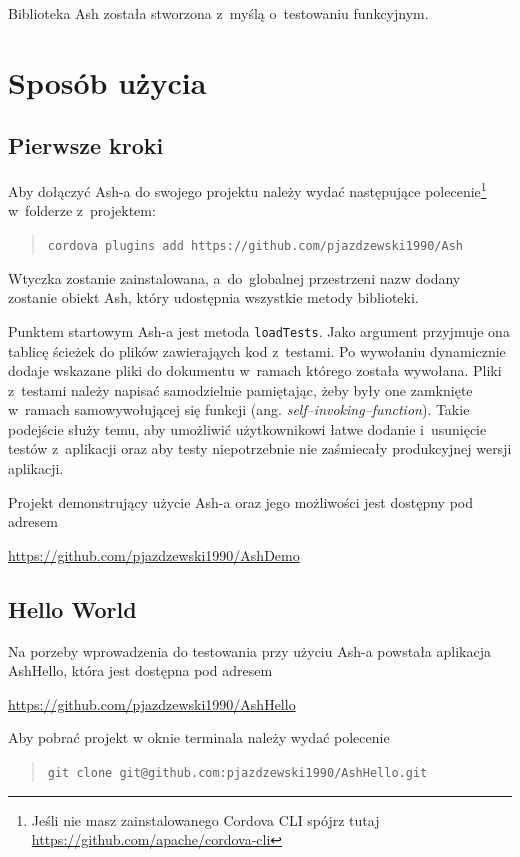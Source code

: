 \documentclass[brudnopis]{xmgr}
\begin{document}
Biblioteka Ash została stworzona z~myślą o~testowaniu funkcyjnym.

\chapter{Sposób użycia}
\section{Pierwsze kroki}

Aby dołączyć Ash-a do swojego projektu należy wydać następujące polecenie\footnote{Jeśli nie masz zainstalowanego Cordova CLI spójrz tutaj \url{https://github.com/apache/cordova-cli} } w~folderze z~projektem:
\begin{quote}
   \texttt{cordova plugins add https://github.com/pjazdzewski1990/Ash}
\end{quote}

Wtyczka zostanie zainstalowana, a~do~globalnej przestrzeni nazw dodany zostanie obiekt Ash, który udostępnia wszystkie metody biblioteki.

Punktem startowym Ash-a jest metoda \texttt{loadTests}. Jako argument przyjmuje ona tablicę ścieżek do plików zawierająych kod z~testami. Po wywołaniu dynamicznie dodaje wskazane pliki do dokumentu w~ramach którego została wywołana. Pliki z~testami należy napisać samodzielnie pamiętając, żeby były one zamknięte w~ramach samowywołującej się funkcji (ang. \textit{self--invoking--function}). Takie podejście służy temu, aby umożliwić użytkownikowi łatwe dodanie i~usunięcie testów z~aplikacji oraz aby testy niepotrzebnie nie zaśmiecały produkcyjnej wersji aplikacji.

Projekt demonstrujący użycie Ash-a oraz jego możliwości jest dostępny pod adresem

\url{https://github.com/pjazdzewski1990/AshDemo}

\section{Hello World}

Na porzeby wprowadzenia do testowania przy użyciu Ash-a powstała aplikacja AshHello, która jest dostępna pod adresem 

\url{https://github.com/pjazdzewski1990/AshHello}

\noindent Aby pobrać projekt w oknie terminala należy wydać polecenie

\begin{quote}
   \texttt{git clone git@github.com:pjazdzewski1990/AshHello.git}
\end{quote}
\end{document}
